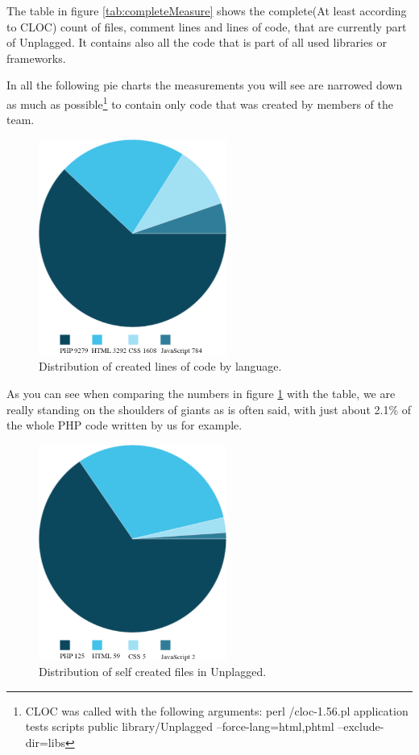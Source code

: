 The table in figure \ref{tab:completeMeasure} shows the complete(At least according to CLOC) count of files, comment lines and lines of code, that are currently part of Unplagged. It contains also all the code 
that is part of all used libraries or frameworks.

In all the following pie charts the measurements you will see are narrowed down as much as possible\footnote{CLOC was called with the following arguments: perl /cloc-1.56.pl application tests scripts public library/Unplagged --force-lang=html,phtml --exclude-dir=libs} to contain only code that was created by members of the team.

\begin{figure}[!h]
  \centering
    \includegraphics[width=0.55\textwidth]{images/loc.png}
  \caption{Distribution of created lines of code by language.}
  \label{fig:locDistribution}
\end{figure}

As you can see when comparing the numbers in figure \ref{fig:locDistribution} with the table, we are really standing on the shoulders of giants as is often said, with just about 2.1\% of the whole PHP code written by us for example.

\begin{figure}[!h]
  \centering
    \includegraphics[width=0.55\textwidth]{images/files.png}
  \caption{Distribution of self created files in Unplagged.}
  \label{fig:fileDistribution}
\end{figure}

